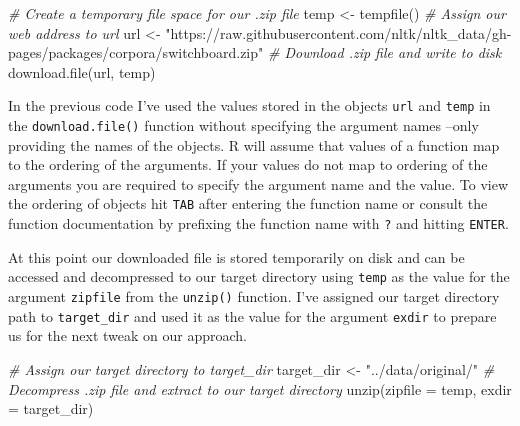 \documentclass[
  letterpaper,
]{scrbook}
\newenvironment{Shaded}{\begin{snugshade}}{\end{snugshade}}
\newcommand{\AttributeTok}[1]{\textcolor[rgb]{0.00,0.00,0.00}{#1}}
\newcommand{\CommentTok}[1]{\textcolor[rgb]{0.00,0.00,0.00}{\textit{#1}}}
\newcommand{\FunctionTok}[1]{\textcolor[rgb]{0.00,0.00,0.00}{#1}}
\newcommand{\NormalTok}[1]{\textcolor[rgb]{0.00,0.00,0.00}{#1}}
\newcommand{\OtherTok}[1]{\textcolor[rgb]{0.00,0.00,0.00}{#1}}
\newcommand{\StringTok}[1]{\textcolor[rgb]{0.00,0.00,0.00}{#1}}
\begin{document}
\begin{Shaded}
\begin{Highlighting}[]
\CommentTok{\# Create a temporary file space for our .zip file}
\NormalTok{temp }\OtherTok{\textless{}{-}} \FunctionTok{tempfile}\NormalTok{()}
\CommentTok{\# Assign our web address to \textasciigrave{}url\textasciigrave{}}
\NormalTok{url }\OtherTok{\textless{}{-}} \StringTok{"https://raw.githubusercontent.com/nltk/nltk\_data/gh{-}pages/packages/corpora/switchboard.zip"}
\CommentTok{\# Download .zip file and write to disk}
\FunctionTok{download.file}\NormalTok{(url, temp)}
\end{Highlighting}
\end{Shaded}

\begin{tcolorbox}[enhanced jigsaw, title=\textcolor{quarto-callout-warning-color}{\faExclamationTriangle}\hspace{0.5em}{Tip}, breakable, colback=white, colframe=quarto-callout-warning-color-frame, bottomrule=.15mm, left=2mm, bottomtitle=1mm, colbacktitle=quarto-callout-warning-color!10!white, opacityback=0, arc=.35mm, toprule=.15mm, coltitle=black, leftrule=.75mm, opacitybacktitle=0.6, toptitle=1mm, titlerule=0mm, rightrule=.15mm]

In the previous code I've used the values stored in the objects
\texttt{url} and \texttt{temp} in the \texttt{download.file()} function
without specifying the argument names --only providing the names of the
objects. R will assume that values of a function map to the ordering of
the arguments. If your values do not map to ordering of the arguments
you are required to specify the argument name and the value. To view the
ordering of objects hit \texttt{TAB} after entering the function name or
consult the function documentation by prefixing the function name with
\texttt{?} and hitting \texttt{ENTER}.

\end{tcolorbox}

At this point our downloaded file is stored temporarily on disk and can
be accessed and decompressed to our target directory using \texttt{temp}
as the value for the argument \texttt{zipfile} from the \texttt{unzip()}
function. I've assigned our target directory path to
\texttt{target\_dir} and used it as the value for the argument
\texttt{exdir} to prepare us for the next tweak on our approach.

\begin{Shaded}
\begin{Highlighting}[]
\CommentTok{\# Assign our target directory to \textasciigrave{}target\_dir\textasciigrave{}}
\NormalTok{target\_dir }\OtherTok{\textless{}{-}} \StringTok{"../data/original/"}
\CommentTok{\# Decompress .zip file and extract to our target directory}
\FunctionTok{unzip}\NormalTok{(}\AttributeTok{zipfile =}\NormalTok{ temp, }\AttributeTok{exdir =}\NormalTok{ target\_dir)}
\end{Highlighting}
\end{Shaded}
\end{document}
